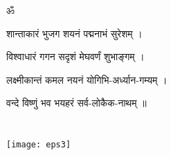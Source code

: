 \documentclass[12pt]{book}
\begin{document}
\def\chaptername{{\sanskrit अध्याय}}
\def\contentsname{{\sanskrit विषय सूची}}

\tableofcontents



















\begin{center}
ॐ

शान्ताकारं भुजग शयनं पद्मनाभं सुरेशम्  ।  

विश्वाधारं गगन सदृशं मेघवर्णं शुभाङ्गम्  ।  

लक्ष्मीकान्तं कमल नयनं योगिभि-अर्ध्यान-गम्यम्  ।  

वन्दे विष्णुं भव भयहरं सर्व-लोकैक-नाथम्  ॥ 

\end{center}
\newpage

\chapter*{}
\begin{center}
\texttt{[image: eps3]}
\end{center}

\end{document}
